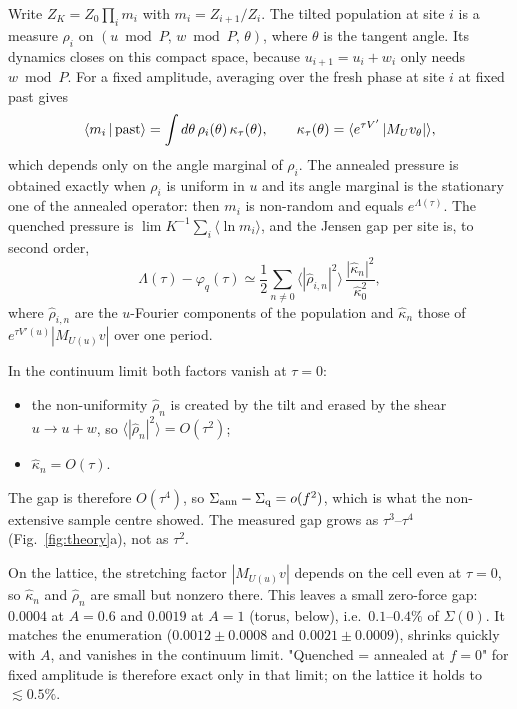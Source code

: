 \documentclass[10pt,a4paper]{article}
\newcommand{\Sann}{\Sigma_{\rm ann}}
\newcommand{\Sq}{\Sigma_{\rm q}}
\begin{document}
Write $Z_K=Z_0\prod_im_i$ with $m_i=Z_{i+1}/Z_i$.
The tilted population at site $i$ is a measure $\rho_i$ on $(u\bmod P,\,w\bmod P,\,\theta)$, where $\theta$ is the tangent angle.
Its dynamics closes on this compact space, because $u_{i+1}=u_i+w_i$ only needs $w\bmod P$.
For a fixed amplitude, averaging over the fresh phase at site $i$ at fixed past gives
\begin{equation}
\langle m_i\,|\,{\rm past}\rangle=\int d\theta\,\rho_i(\theta)\,\kappa_\tau(\theta),\qquad
\kappa_\tau(\theta)=\langle e^{\tau V'}\,|M_Uv_\theta|\rangle ,
\end{equation}
which depends only on the angle marginal of $\rho_i$.
The annealed pressure is obtained exactly when $\rho_i$ is uniform in $u$ and its angle marginal is the stationary one of the annealed operator: then $m_i$ is non-random and equals $e^{\Lambda(\tau)}$.
The quenched pressure is $\lim K^{-1}\sum_i\langle\ln m_i\rangle$, and the Jensen gap per site is, to second order,
\begin{equation}
\Lambda(\tau)-\varphi_q(\tau)\simeq\frac12\sum_{n\ne0}\big\langle|\hat\rho_{i,n}|^2\big\rangle\,\frac{|\hat\kappa_n|^2}{\hat\kappa_0^2},
\label{eq:jgap}
\end{equation}
where $\hat\rho_{i,n}$ are the $u$-Fourier components of the population and $\hat\kappa_n$ those of $e^{\tau V'(u)}|M_{U(u)}v|$ over one period.

In the continuum limit both factors vanish at $\tau=0$:
\begin{itemize}
\item the non-uniformity $\hat\rho_n$ is created by the tilt and erased by the shear $u\to u+w$, so $\langle|\hat\rho_n|^2\rangle=O(\tau^2)$;
\item $\hat\kappa_n=O(\tau)$.
\end{itemize}
The gap is therefore $O(\tau^4)$, so $\Sann-\Sq=o(f^2)$, which is what the non-extensive sample centre showed.
The measured gap grows as $\tau^{3}$--$\tau^{4}$ (Fig.~\ref{fig:theory}a), not as $\tau^2$.

On the lattice, the stretching factor $|M_{U(u)}v|$ depends on the cell even at $\tau=0$, so $\hat\kappa_n$ and $\hat\rho_n$ are small but nonzero there.
This leaves a small zero-force gap: $0.0004$ at $A=0.6$ and $0.0019$ at $A=1$ (torus, below), i.e.\ $0.1$--$0.4\%$ of $\Sigma(0)$.
It matches the enumeration ($0.0012\pm0.0008$ and $0.0021\pm0.0009$), shrinks quickly with $A$, and vanishes in the continuum limit.
"Quenched = annealed at $f=0$" for fixed amplitude is therefore exact only in that limit; on the lattice it holds to $\lesssim0.5\%$.
\end{document}
